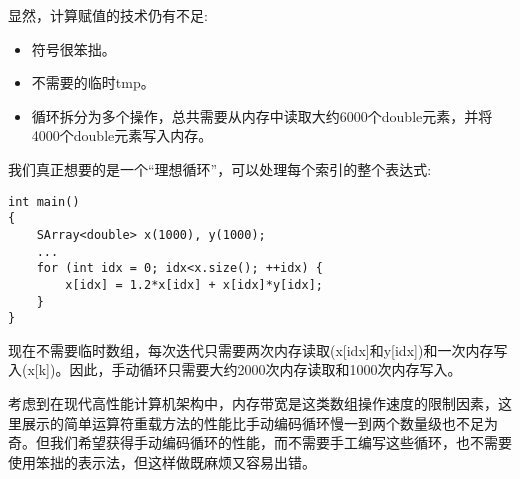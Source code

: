 显然，计算赋值的技术仍有不足:

\begin{itemize}
\item 
符号很笨拙。

\item 
不需要的临时tmp。

\item 
循环拆分为多个操作，总共需要从内存中读取大约6000个double元素，并将4000个double元素写入内存。
\end{itemize}

我们真正想要的是一个“理想循环”，可以处理每个索引的整个表达式:

\begin{lstlisting}[style=styleCXX]
int main()
{
	SArray<double> x(1000), y(1000);
	...
	for (int idx = 0; idx<x.size(); ++idx) {
		x[idx] = 1.2*x[idx] + x[idx]*y[idx];
	}
}
\end{lstlisting}

现在不需要临时数组，每次迭代只需要两次内存读取(x[idx]和y[idx])和一次内存写入(x[k])。因此，手动循环只需要大约2000次内存读取和1000次内存写入。

考虑到在现代高性能计算机架构中，内存带宽是这类数组操作速度的限制因素，这里展示的简单运算符重载方法的性能比手动编码循环慢一到两个数量级也不足为奇。但我们希望获得手动编码循环的性能，而不需要手工编写这些循环，也不需要使用笨拙的表示法，但这样做既麻烦又容易出错。















